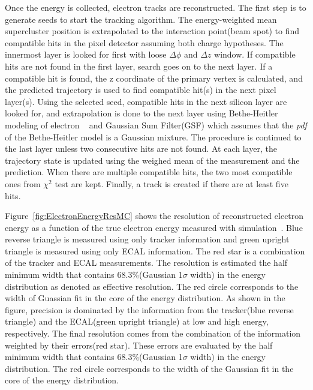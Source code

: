 Once the energy is collected, electron tracks are reconstructed. The first step is 
to generate seeds to start the tracking algorithm. The energy-weighted mean 
supercluster position is extrapolated to the interaction point(beam spot) 
to find compatible hits in the pixel detector assuming both charge hypotheses. 
The innermost layer is looked for first with loose $\Delta\phi$ and $\Delta z$ window. 
If compatible hits are not found in the first layer, search goes on to the next layer. 
If a compatible hit is found, the z coordinate of the primary vertex is calculated,
and the predicted trajectory is used to find compatible hit(s) in the next pixel layer(s).  
Using the selected seed, compatible hits in the next silicon layer are looked for,  
and extrapolation is done to the next layer using Bethe-Heitler modeling of electron 
\brem~\cite{BetheHeitler} 
and Gaussian Sum Filter(GSF) \cite{0954-3899-31-9-N01} which assumes that the \textit{pdf} 
of the Bethe-Heitler model is a Gaussian mixture. 
The procedure is continued to the last layer unless two consecutive hits are not found. 
At each layer, the trajectory state is updated using the weighed mean of the measurement 
and the prediction. When there are multiple compatible hits, the two most compatible ones 
from $\chi^2$ test are kept. Finally, a track is created if there are at least five hits. 

Figure~\ref{fig:ElectronEnergyResMC} shows the resolution of reconstructed electron energy 
as a function of the true electron energy measured with simulation~\cite{PAS-HIG-13-002}.   
Blue reverse triangle is measured using only tracker information 
and green upright triangle is measured using only ECAL information. 
The red star is a combination of the tracker and ECAL measurements. 
The resolution is estimated the half minimum width that
contains 68.3\%(Gaussian 1$\sigma$ width) in the energy distribution
as denoted as effective resolution. The red circle corresponds to the 
width of Guassian fit in the core of the energy distribution.
As shown in the figure, precision is dominated by the information 
from the tracker(blue reverse triangle) and the ECAL(green upright triangle) 
at low and high energy, respectively. 
The final resolution comes from the combination of the information weighted by 
their errors(red star). These errors are evaluated by the half minimum width that 
contains 68.3\%(Gaussian 1$\sigma$ width) in the energy distribution. 
The red circle corresponds to the width of the Gaussian fit in the core of the 
energy distribution. 

